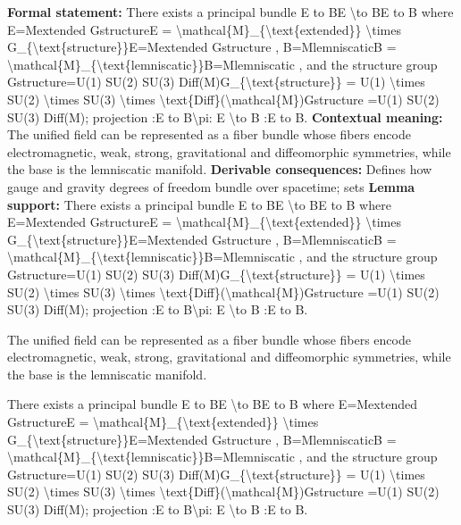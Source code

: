 \begingroup\footnotesize\setlength{\emergencystretch}{3em}\sloppy
\textbf{Formal statement:} There exists a principal bundle E to BE \textbackslash{}to BE to B where E=Mextended GstructureE = \textbackslash{}mathcal\{M\}\_\{\textbackslash{}text\{extended\}\} \textbackslash{}times G\_\{\textbackslash{}text\{structure\}\}E=Mextended  Gstructure , B=MlemniscaticB = \textbackslash{}mathcal\{M\}\_\{\textbackslash{}text\{lemniscatic\}\}B=Mlemniscatic , and the structure group Gstructure=U(1) SU(2) SU(3) Diff(M)G\_\{\textbackslash{}text\{structure\}\} = U(1) \textbackslash{}times SU(2) \textbackslash{}times SU(3) \textbackslash{}times \textbackslash{}text\{Diff\}(\textbackslash{}mathcal\{M\})Gstructure =U(1) SU(2) SU(3) Diff(M); projection  :E to B\textbackslash{}pi: E \textbackslash{}to B :E to B.
\textbf{Contextual meaning:} The unified field can be represented as a fiber bundle whose fibers encode electromagnetic, weak, strong, gravitational and diffeomorphic symmetries, while the base is the lemniscatic manifold.
\textbf{Derivable consequences:} Defines how gauge and gravity degrees of freedom bundle over spacetime; sets
\textbf{Lemma support:} There exists a principal bundle E to BE \textbackslash{}to BE to B where E=Mextended GstructureE = \textbackslash{}mathcal\{M\}\_\{\textbackslash{}text\{extended\}\} \textbackslash{}times G\_\{\textbackslash{}text\{structure\}\}E=Mextended  Gstructure , B=MlemniscaticB = \textbackslash{}mathcal\{M\}\_\{\textbackslash{}text\{lemniscatic\}\}B=Mlemniscatic , and the structure group Gstructure=U(1) SU(2) SU(3) Diff(M)G\_\{\textbackslash{}text\{structure\}\} = U(1) \textbackslash{}times SU(2) \textbackslash{}times SU(3) \textbackslash{}times \textbackslash{}text\{Diff\}(\textbackslash{}mathcal\{M\})Gstructure =U(1) SU(2) SU(3) Diff(M); projection  :E to B\textbackslash{}pi: E \textbackslash{}to B :E to B.\par
\endgroup

The unified field can be represented as a fiber bundle whose fibers encode electromagnetic, weak, strong, gravitational and diffeomorphic symmetries, while the base is the lemniscatic manifold.

There exists a principal bundle E to BE \textbackslash{}to BE to B where E=Mextended GstructureE = \textbackslash{}mathcal\{M\}\_\{\textbackslash{}text\{extended\}\} \textbackslash{}times G\_\{\textbackslash{}text\{structure\}\}E=Mextended  Gstructure , B=MlemniscaticB = \textbackslash{}mathcal\{M\}\_\{\textbackslash{}text\{lemniscatic\}\}B=Mlemniscatic , and the structure group Gstructure=U(1) SU(2) SU(3) Diff(M)G\_\{\textbackslash{}text\{structure\}\} = U(1) \textbackslash{}times SU(2) \textbackslash{}times SU(3) \textbackslash{}times \textbackslash{}text\{Diff\}(\textbackslash{}mathcal\{M\})Gstructure =U(1) SU(2) SU(3) Diff(M); projection  :E to B\textbackslash{}pi: E \textbackslash{}to B :E to B.

